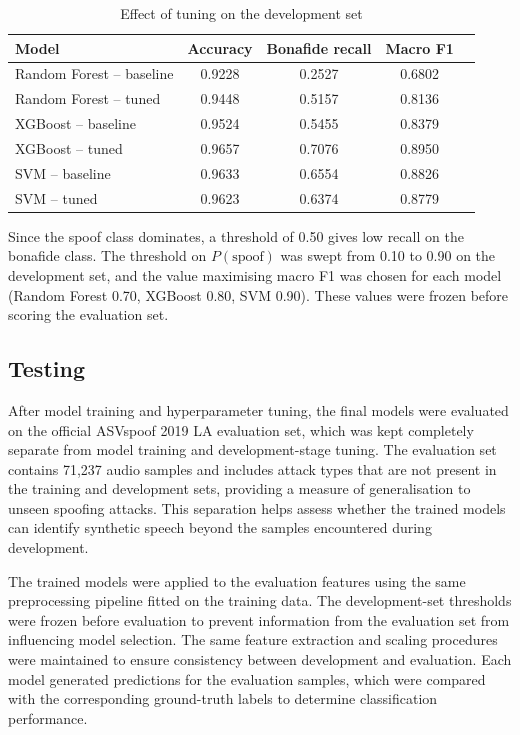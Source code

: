 \documentclass[12pt,a4paper]{report}
\begin{document}
\begin{table}[H]
\centering
\begin{tabular}{lcccc}
\toprule
\textbf{Model} & \textbf{Accuracy} & \textbf{Bonafide recall} & \textbf{Macro F1} \\
\midrule
Random Forest -- baseline & 0.9228 & 0.2527 & 0.6802\\
Random Forest -- tuned & 0.9448 & 0.5157 & 0.8136 \\
XGBoost -- baseline & 0.9524 & 0.5455 & 0.8379 \\
XGBoost -- tuned & 0.9657 & 0.7076 & 0.8950 \\
SVM -- baseline & 0.9633 & 0.6554 & 0.8826 \\
SVM -- tuned & 0.9623 & 0.6374 & 0.8779 \\
\bottomrule
\end{tabular}
\caption{Effect of tuning on the development set}
\label{tab:tuning}
\end{table}

 Since the spoof class dominates, a threshold of 0.50 gives low recall on the bonafide class. The threshold on $P(\text{spoof})$ was swept from 0.10 to 0.90 on the development set, and the value maximising macro F1 was chosen for each model (Random Forest 0.70, XGBoost 0.80, SVM 0.90). These values were frozen before scoring the evaluation set.


\subsection{Testing}

After model training and hyperparameter tuning, the final models were evaluated on the official ASVspoof 2019 LA evaluation set, which was kept completely separate from model training and development-stage tuning. The evaluation set contains 71,237 audio samples and includes attack types that are not present in the training and development sets, providing a measure of generalisation to unseen spoofing attacks. This separation helps assess whether the trained models can identify synthetic speech beyond the samples encountered during development.

The trained models were applied to the evaluation features using the same preprocessing pipeline fitted on the training data. The development-set thresholds were frozen before evaluation to prevent information from the evaluation set from influencing model selection. The same feature extraction and scaling procedures were maintained to ensure consistency between development and evaluation. Each model generated predictions for the evaluation samples, which were compared with the corresponding ground-truth labels to determine classification performance.
\end{document}
